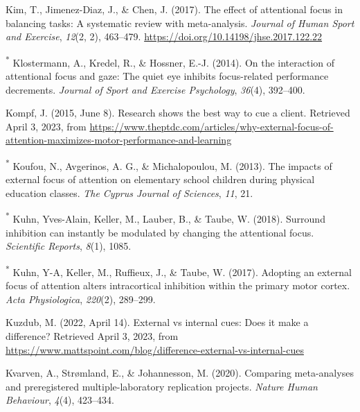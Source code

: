 \documentclass[
  man, donotrepeattitle,floatsintext]{apa7}
\newlength{\cslhangindent}
\newlength{\cslentryspacingunit} %
\newenvironment{CSLReferences}[2] %
 {%
  \setlength{\parindent}{0pt}
  \ifodd #1
  \let\oldpar\par
  \def\par{\hangindent=\cslhangindent\oldpar}
  \fi
  \setlength{\parskip}{#2\cslentryspacingunit}
 }%
 {}
\begin{document}
\begin{CSLReferences}{1}{0}
\leavevmode{}%
Kim, T., Jimenez-Diaz, J., \& Chen, J. (2017). The effect of attentional focus in balancing tasks: {A} systematic review with meta-analysis. \emph{Journal of Human Sport and Exercise}, \emph{12}(2, 2), 463--479. \url{https://doi.org/10.14198/jhse.2017.122.22}

\leavevmode{}%
\textsuperscript{*} Klostermann, A., Kredel, R., \& Hossner, E.-J. (2014). On the interaction of attentional focus and gaze: The quiet eye inhibits focus-related performance decrements. \emph{Journal of Sport and Exercise Psychology}, \emph{36}(4), 392--400.

\leavevmode{}%
Kompf, J. (2015, June 8). Research shows the best way to cue a client. Retrieved April 3, 2023, from \url{https://www.theptdc.com/articles/why-external-focus-of-attention-maximizes-motor-performance-and-learning}

\leavevmode{}%
\textsuperscript{*} Koufou, N., Avgerinos, A. G., \& Michalopoulou, M. (2013). The impacts of external focus of attention on elementary school children during physical education classes. \emph{The Cyprus Journal of Sciences}, \emph{11}, 21.

\leavevmode{}%
\textsuperscript{*} Kuhn, Yves-Alain, Keller, M., Lauber, B., \& Taube, W. (2018). Surround inhibition can instantly be modulated by changing the attentional focus. \emph{Scientific Reports}, \emph{8}(1), 1085.

\leavevmode{}%
\textsuperscript{*} Kuhn, Y-A, Keller, M., Ruffieux, J., \& Taube, W. (2017). Adopting an external focus of attention alters intracortical inhibition within the primary motor cortex. \emph{Acta Physiologica}, \emph{220}(2), 289--299.

\leavevmode{}%
Kuzdub, M. (2022, April 14). External vs internal cues: {Does} it make a difference? Retrieved April 3, 2023, from \url{https://www.mattspoint.com/blog/difference-external-vs-internal-cues}

\leavevmode{}%
Kvarven, A., Strømland, E., \& Johannesson, M. (2020). Comparing meta-analyses and preregistered multiple-laboratory replication projects. \emph{Nature Human Behaviour}, \emph{4}(4), 423--434.


\end{CSLReferences}
\end{document}
